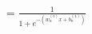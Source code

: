 \documentclass[preview]{standalone}
\begin{document}
\begin{align*}
= \frac{1}{1+e^{-(w_n^{(1)}x+b_n^{(1)})}}
\end{align*}
\end{document}
